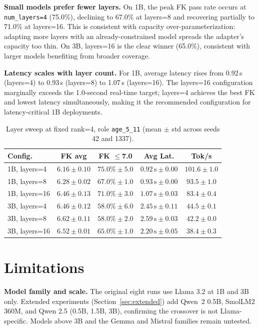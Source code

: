 \documentclass[AMA,Times1COL]{WileyNJDv5} %
\begin{document}
\textbf{Small models prefer fewer layers.} On 1B, the peak FK pass rate occurs at \texttt{num\_layers=4} (75.0\%), declining to 67.0\% at layers=8 and recovering partially to 71.0\% at layers=16. This is consistent with capacity over-parameterization: adapting more layers with an already-constrained model spreads the adapter's capacity too thin. On 3B, layers=16 is the clear winner (65.0\%), consistent with larger models benefiting from broader coverage.

\textbf{Latency scales with layer count.} For 1B, average latency rises from 0.92\,s (layers=4) to 0.93\,s (layers=8) to 1.07\,s (layers=16). The layers=16 configuration marginally exceeds the 1.0-second real-time target; layers=4 achieves the best FK and lowest latency simultaneously, making it the recommended configuration for latency-critical 1B deployments.

\begin{table}[!t]
  \centering
  \caption{Layer sweep at fixed rank=4, role \texttt{age\_5\_11} (mean $\pm$ std across seeds 42 and 1337).}
  \label{tab:layersweep}
  \footnotesize
  \begin{tabular}{lcccc}
    \hline
    Config. & FK avg & FK $\leq$7.0 & Avg Lat. & Tok/s \\
    \hline
    1B, layers=4  & $6.16 \pm 0.10$ & $75.0\% \pm 5.0$ & $0.92\,\text{s} \pm 0.00$ & $101.6 \pm 1.0$ \\
    1B, layers=8  & $6.28 \pm 0.02$ & $67.0\% \pm 1.0$ & $0.93\,\text{s} \pm 0.00$ & $93.5 \pm 1.0$  \\
    1B, layers=16 & $6.46 \pm 0.13$ & $71.0\% \pm 3.0$ & $1.07\,\text{s} \pm 0.03$ & $83.4 \pm 0.4$  \\
    3B, layers=4  & $6.46 \pm 0.12$ & $58.0\% \pm 6.0$ & $2.45\,\text{s} \pm 0.11$ & $44.5 \pm 0.1$  \\
    3B, layers=8  & $6.62 \pm 0.11$ & $58.0\% \pm 2.0$ & $2.59\,\text{s} \pm 0.03$ & $42.2 \pm 0.0$  \\
    3B, layers=16 & $6.52 \pm 0.01$ & $65.0\% \pm 1.0$ & $2.20\,\text{s} \pm 0.05$ & $38.4 \pm 0.3$  \\
    \hline
  \end{tabular}
\end{table}

\section{Limitations}\label{sec:limitations}

\textbf{Model family and scale.} The original eight runs use Llama 3.2 at 1B and 3B only. Extended experiments (Section~\ref{sec:extended}) add Qwen~2 0.5B, SmolLM2 360M, and Qwen 2.5 (0.5B, 1.5B, 3B), confirming the crossover is not Llama-specific. Models above 3B and the Gemma and Mistral families remain untested.
\end{document}
